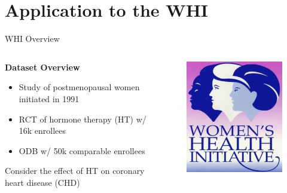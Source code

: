 \documentclass[usenames,dvipsnames]{beamer}
\theoremstyle{definition} %
\begin{document}
\section{Application to the WHI}


\begin{frame}{WHI Overview}
\begin{columns}
\begin{column}{0.48\textwidth}
\textbf{Dataset Overview}
\begin{itemize}
\item Study of postmenopausal women initiated in 1991 
\item RCT of hormone therapy (HT) w/ 16k enrollees
\item ODB w/ 50k comparable enrollees
\end{itemize}
\vspace{3mm}
Consider the effect of HT on coronary heart disease (CHD)
\end{column}
\begin{column}{0.48\textwidth}
\begin{figure}[width = 0.48\textwidth]
\includegraphics[width = \textwidth]{WHI_Logo}
\end{figure}
\end{column}
\end{columns} 
\end{frame}
\end{document}
